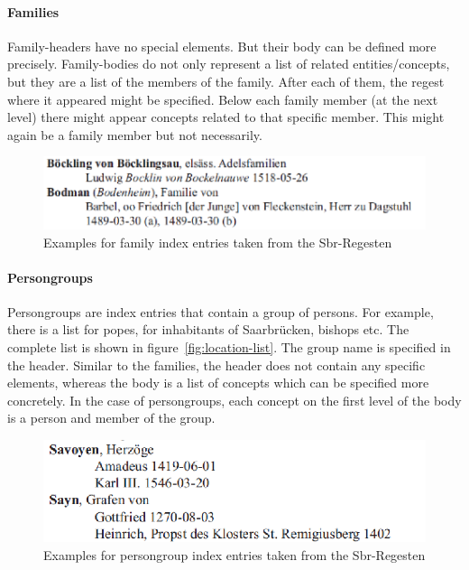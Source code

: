 \paragraph{Families}
Family-headers have no special elements. But their body can be defined more precisely. Family-bodies do not only represent a list of related entities/concepts, but they are a list of the members of the family. After each of them, the regest where it appeared might be specified. Below each family member (at the next level) there might appear concepts related to that specific member. This might again be a family member but not necessarily.

\begin{figure}[h]
  \centering
  \includegraphics[scale=0.45]{img/family-example}
  \caption{Examples for family index entries taken from the Sbr-Regesten}
  \label{fig:family-example}
\end{figure}

\paragraph{Persongroups}
Persongroups are index entries that contain a group of persons. For example, there is a list for popes, for inhabitants of Saarbrücken, bishops etc. The complete list is shown in figure~\ref{fig:location-list}. The group name is specified in the header. Similar to the families, the header does not contain any specific elements, whereas the body is a list of concepts which can be specified more concretely. In the case of persongroups, each concept on the first level of the body is a person and member of the group. %

\begin{figure}[h]
  \centering
  \includegraphics[scale=0.45]{img/persongroup-example}
  \caption{Examples for persongroup index entries taken from the Sbr-Regesten}
  \label{fig:persongroup-example}
\end{figure}

